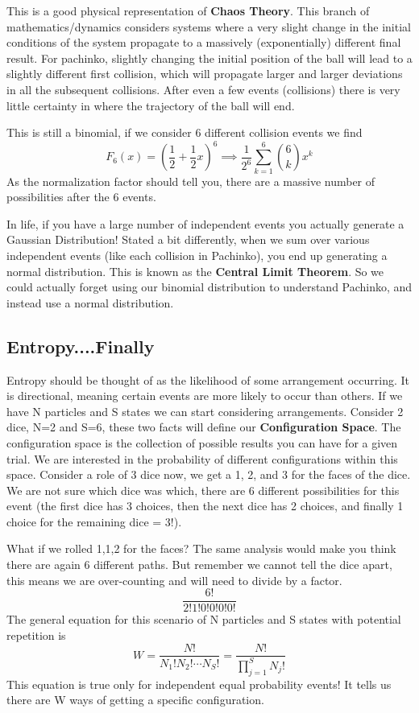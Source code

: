 \documentclass{article}
\begin{document}
This is a good physical representation of \textbf{Chaos Theory}.
This branch of mathematics/dynamics considers systems where a very slight change in the initial conditions of the system propagate to a massively (exponentially) different final result. 
For pachinko, slightly changing the initial position of the ball will lead to a slightly different first collision, which will propagate larger and larger deviations in all the subsequent collisions. 
After even a few events (collisions) there is very little certainty in where the trajectory of the ball will end. 

This is still a binomial, if we consider 6 different collision events we find
\begin{equation}
F_6(x) = (\frac{1}{2} + \frac{1}{2}x)^6 \implies \frac{1}{2^6}\sum_{k=1}^6\binom{6}{k}x^k
\end{equation}
As the normalization factor should tell you, there are a massive number of possibilities after the 6 events. 

In life, if you have a large number of independent events you actually generate a Gaussian Distribution!
Stated a bit differently, when we sum over various independent events (like each collision in Pachinko), you end up generating a normal distribution.
This is known as the \textbf{Central Limit Theorem}. 
So we could actually forget using our binomial distribution to understand Pachinko, and instead use a normal distribution. 

\subsection*{Entropy....Finally}
Entropy should be thought of as the likelihood of some arrangement occurring. 
It is directional, meaning certain events are more likely to occur than others. 
If we have N particles and S states we can start considering arrangements.
Consider 2 dice, N=2 and S=6, these two facts will define our \textbf{Configuration Space}. 
The configuration space is the collection of possible results you can have for a given trial. 
We are interested in the probability of different configurations within this space. 
Consider a role of 3 dice now, we get a 1, 2, and 3 for the faces of the dice. 
We are not sure which dice was which, there are 6 different possibilities for this event (the first dice has 3 choices, then the next dice has 2 choices, and finally 1 choice for the remaining dice = 3!). 

What if we rolled 1,1,2 for the faces? 
The same analysis would make you think there are again 6 different paths. 
But remember we cannot tell the dice apart, this means we are over-counting and will need to divide by a factor. 
\begin{equation}
\frac{6!}{2!1!0!0!0!0!}
\end{equation}
The general equation for this scenario of N particles and S states with potential repetition is
\begin{equation}
W = \frac{N!}{N_1!N_2!\cdots N_S!} = \frac{N!}{\displaystyle \prod_{j=1}^S N_j!}
\end{equation}
This equation is true only for independent equal probability events!
It tells us there are W ways of getting a specific configuration. 
\end{document}
